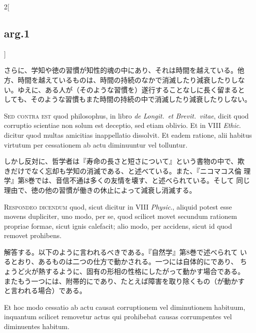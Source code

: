 \documentclass[paper=a4paper,fontsize=10pt,jafontsize=9pt,titlepage]{jlreq}
\begin{document}
\begin{paracol}{2}[\subsection{arg.1}]
\switchcolumn

さらに、学知や徳の習慣が知性的魂の中にあり、それは時間を越えている。他
方、時間を越えているものは、時間の持続のなかで消滅したり減衰したりしな
い。ゆえに、ある人が（そのような習慣を）遂行することなしに長く留まると
しても、そのような習慣もまた時間の持続の中で消滅したり減衰したりしない。

\switchcolumn*[\subsection{s.c.}]

{\scshape Sed contra est} quod philosophus, in libro {\itshape de
Longit.~et Brevit.~vitae}, dicit quod corruptio scientiae non solum
est deceptio, sed etiam oblivio. Et in VIII {\itshape Ethic}. dicitur
quod multas amicitias inappellatio dissolvit. Et eadem ratione, alii
habitus virtutum per cessationem ab actu diminuuntur vel tolluntur.

\switchcolumn

しかし反対に、哲学者は『寿命の長さと短さについて』という書物の中で、欺
きだけでなく忘却も学知の消滅である、と述べている。また、『ニコマコス倫
理学』第8巻では、音信不通は多くの友情を壊す、と述べられている。そして
同じ理由で、徳の他の習慣が働きの休止によって減衰し消滅する。


{\scshape Respondeo dicendum} quod, sicut dicitur in VIII {\itshape
Physic}., aliquid potest esse movens dupliciter, uno modo, per se,
quod scilicet movet secundum rationem propriae formae, sicut ignis
calefacit; alio modo, per accidens, sicut id quod removet prohibens.

\switchcolumn

解答する。以下のように言われるべきである。『自然学』第8巻で述べられて
いるとおり、あるものは二つの仕方で動かされる。一つには自体的にであり、
ちょうど火が熱するように、固有の形相の性格にしたがって動かす場合である。
またもう一つには、附帯的にであり、たとえば障害を取り除くもの（が動かす
と言われる場合）である。

\switchcolumn*

Et hoc modo cessatio ab actu causat corruptionem vel diminutionem
habituum, inquantum scilicet removetur actus qui prohibebat causas
corrumpentes vel diminuentes habitum.

\switchcolumn


\end{paracol}
\end{document}
